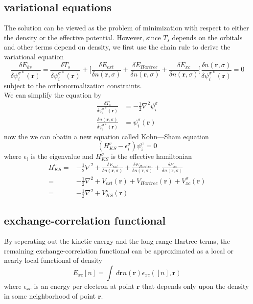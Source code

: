 \documentclass[11pt]{article}
\begin{document}
\subsection{variational equations}
The solution can be viewed as the problem of minimization with respect to either the density or the effective potential. However,
since $T_s$ depends on the orbitals and other terms depend on density, we first use the chain rule to derive the variational equation
\begin{equation}
    \frac{\delta E_{ks}}{\delta\psi_i^{\sigma*}(\mathbf{r})}=\frac{\delta T_{s}}{\delta\psi_i^{\sigma*}(\mathbf{r})}+\bigg[\frac{\delta E_{ext}}{\delta n(\mathbf{r},\sigma)}+\frac{\delta E_{Hartree}}{\delta n(\mathbf{r},\sigma)}+\frac{\delta E_{xc}}{\delta n(\mathbf{r},\sigma)}\bigg]\frac{\delta n(\mathbf{r},\sigma)}{\delta\psi_i^{\sigma*}(\mathbf{r})}=0
\end{equation}
subject to the orthonormalization constraints.\\
We can simplify the equation by
\begin{align}
    \frac{\delta T_{s}}{\delta\psi_i^{\sigma*}(\mathbf{r})}&=-\frac{1}{2}\nabla^2\psi_i^\sigma\\
    \frac{\delta n(\mathbf{r},\sigma)}{\delta\psi_i^{\sigma*}(\mathbf{r})}&=\psi_i^\sigma(\mathbf{r})
\end{align}
now the we can obatin a new equation called Kohn—Sham equation
\begin{equation}
    (H^\sigma_{KS}-\epsilon_i^\sigma)\psi_i^\sigma=0
\end{equation}
where $\epsilon_i$ is the eigenvalue and $H^\sigma_{KS}$ is the effective hamiltonian
\begin{equation}
    \begin{split}
        H^\sigma_{KS}=&-\frac{1}{2}\nabla^2+\frac{\delta E_{ext}}{\delta n(\mathbf{r},\sigma)}+\frac{\delta E_{Hartree}}{\delta n(\mathbf{r},\sigma)}+\frac{\delta E_{xc}}{\delta n(\mathbf{r},\sigma)}\\
        =&-\frac{1}{2}\nabla^2+V_{ext}(\mathbf{r})+V_{Hartree}(\mathbf{r})+V_{xc}^\sigma(\mathbf{r})\\
        =&-\frac{1}{2}\nabla^2+V_{KS}^\sigma(\mathbf{r})
    \end{split}
\end{equation}
\subsection{exchange-correlation functional}
By seperating out the kinetic energy and the long-range Hartree terms, the remaining exchange-correlation functional can be approximated as
a local or nearly local functional of density
\begin{equation}
    E_{xc}[n]=\int\,d\mathbf{r}n(\mathbf{r})\epsilon_{xc}([n],\mathbf{r})
\end{equation}
where $\epsilon_{xc}$ is an energy per electron at point $\mathbf{r}$ that depends only upon the density in some neighborhood of point $\mathbf{r}$.
\end{document}
